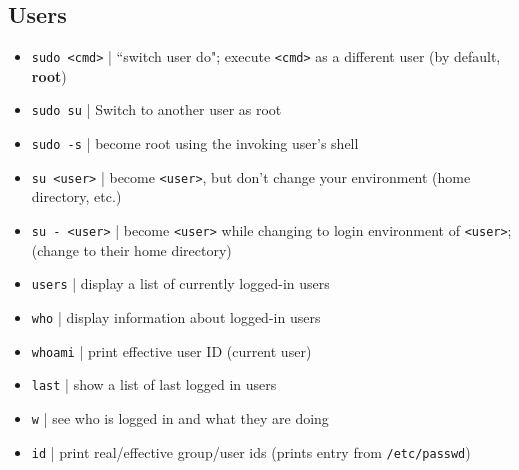 \documentclass{article}
\begin{document}
\begin{multicols}{2}
\section{Users}
\begin{itemize}
	\item \texttt{sudo <cmd>} | ``switch user do"; execute \texttt{<cmd>} as a different user (by default, \textbf{root})
	\item \texttt{sudo su} | Switch to another user as root
	\item \texttt{sudo -s} | become root using the invoking user's shell
	\item \texttt{su \texttt{<user>}} | become \texttt{<user>}, but don't change your environment (home directory, etc.)
	\item \texttt{su - \texttt{<user>}} | become \texttt{<user>} while changing to login environment of \texttt{<user>}; (change to their home directory)
	\item \texttt{users} | display a list of currently logged-in users
	\item \texttt{who} | display information about logged-in users
	\item \texttt{whoami} | print effective user ID (current user)
	\item \texttt{last} | show a list of last logged in users
	\item \texttt{w} | see who is logged in and what they are doing
	\item \texttt{id} | print real/effective group/user ids (prints entry from \texttt{/etc/passwd})
\end{itemize}


\end{multicols}
\end{document}
